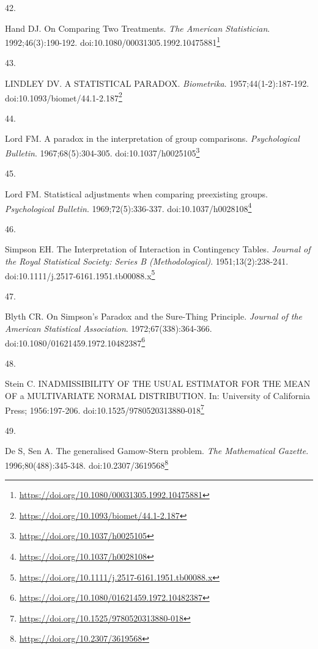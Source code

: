 \documentclass[
  a4paper,
]{book}
\newlength{\cslhangindent}
\newlength{\csllabelwidth}
\newlength{\cslentryspacingunit} %
\newenvironment{CSLReferences}[2] %
 {%
  \setlength{\parindent}{0pt}
  \ifodd #1
  \let\oldpar\par
  \def\par{\hangindent=\cslhangindent\oldpar}
  \fi
  \setlength{\parskip}{#2\cslentryspacingunit}
 }%
 {}
\newcommand{\CSLLeftMargin}[1]{\parbox[t]{\csllabelwidth}{#1}}
\newcommand{\CSLRightInline}[1]{\parbox[t]{\linewidth - \csllabelwidth}{#1}\break}
\renewcommand{\href}[2]{#2\footnote{\url{#1}}}
\begin{document}
\begin{CSLReferences}{0}{0}
\leavevmode{}%
\CSLLeftMargin{42. }%
\CSLRightInline{Hand DJ. On Comparing Two Treatments. \emph{The American Statistician}. 1992;46(3):190-192. doi:\href{https://doi.org/10.1080/00031305.1992.10475881}{10.1080/00031305.1992.10475881}}

\leavevmode{}%
\CSLLeftMargin{43. }%
\CSLRightInline{LINDLEY DV. A STATISTICAL PARADOX. \emph{Biometrika}. 1957;44(1-2):187-192. doi:\href{https://doi.org/10.1093/biomet/44.1-2.187}{10.1093/biomet/44.1-2.187}}

\leavevmode{}%
\CSLLeftMargin{44. }%
\CSLRightInline{Lord FM. A paradox in the interpretation of group comparisons. \emph{Psychological Bulletin}. 1967;68(5):304-305. doi:\href{https://doi.org/10.1037/h0025105}{10.1037/h0025105}}

\leavevmode{}%
\CSLLeftMargin{45. }%
\CSLRightInline{Lord FM. Statistical adjustments when comparing preexisting groups. \emph{Psychological Bulletin}. 1969;72(5):336-337. doi:\href{https://doi.org/10.1037/h0028108}{10.1037/h0028108}}

\leavevmode{}%
\CSLLeftMargin{46. }%
\CSLRightInline{Simpson EH. The Interpretation of Interaction in Contingency Tables. \emph{Journal of the Royal Statistical Society: Series B (Methodological)}. 1951;13(2):238-241. doi:\href{https://doi.org/10.1111/j.2517-6161.1951.tb00088.x}{10.1111/j.2517-6161.1951.tb00088.x}}

\leavevmode{}%
\CSLLeftMargin{47. }%
\CSLRightInline{Blyth CR. On Simpson's Paradox and the Sure-Thing Principle. \emph{Journal of the American Statistical Association}. 1972;67(338):364-366. doi:\href{https://doi.org/10.1080/01621459.1972.10482387}{10.1080/01621459.1972.10482387}}

\leavevmode{}%
\CSLLeftMargin{48. }%
\CSLRightInline{Stein C. INADMISSIBILITY OF THE USUAL ESTIMATOR FOR THE MEAN OF a MULTIVARIATE NORMAL DISTRIBUTION. In: University of California Press; 1956:197-206. doi:\href{https://doi.org/10.1525/9780520313880-018}{10.1525/9780520313880-018}}

\leavevmode{}%
\CSLLeftMargin{49. }%
\CSLRightInline{De S, Sen A. The generalised Gamow-Stern problem. \emph{The Mathematical Gazette}. 1996;80(488):345-348. doi:\href{https://doi.org/10.2307/3619568}{10.2307/3619568}}


\end{CSLReferences}
\end{document}
